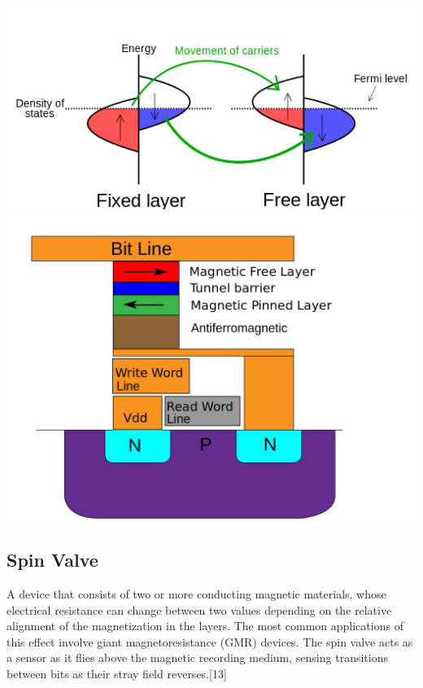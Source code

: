 \documentclass{article}
\begin{document}
\begin{center}
\includegraphics[scale=0.45]{Spin_Transfer_Torque_with_Stoner_model.svg.png}
\includegraphics[scale=0.15]{1200px-MRAM-Cell-Simplified.svg.png}
\end{center}

\subsection{Spin Valve}
A device that consists of two or more conducting magnetic materials, whose electrical resistance can change between two values depending on the relative alignment of the magnetization in the layers. The most common applications of this effect involve giant magnetoresistance (GMR) devices. The spin valve acts as a sensor as it flies above the magnetic recording medium, sensing transitions between bits as their stray field reverses.[13]
\end{document}
